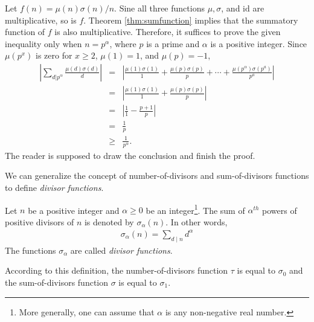 \documentclass[12pt]{subfile}
\begin{document}
	\begin{solution}
		Let $f(n)=\mu(n)\sigma(n)/n$. Sine all three functions $\mu, \sigma$, and $\text{id}$ are multiplicative, so is $f$. Theorem \ref{thm:sumfunction} implies that the summatory function of $f$ is also multiplicative. Therefore, it suffices to prove the given inequality only when $n=p^\alpha$, where $p$ is a prime and $\alpha$ is a positive integer. Since $\mu(p^x)$ is zero for $x \geq 2$, $\mu(1)=1$, and $\mu(p)=-1$,
			\begin{eqnarray*}
				\left|\sum_{d|p^\alpha}\frac{\mu(d)\sigma(d)}{d}\right|
						&=& \left|\frac{\mu(1)\sigma(1)}{1} + \frac{\mu(p)\sigma(p)}{p} + \cdots + \frac{\mu(p^\alpha)\sigma(p^a)}{p^a}\right| \\
						&=& \left|\frac{\mu(1)\sigma(1)}{1} + \frac{\mu(p)\sigma(p)}{p}\right|\\
						&=& \left|\frac{1}{1} - \frac{p+1}{p}\right|\\
						&=& \frac{1}{p}\\
						&\geq& \frac{1}{p^\alpha}.
			\end{eqnarray*}
		The reader is supposed to draw the conclusion and finish the proof.
	\end{solution}



We can generalize the concept of number-of-divisors and sum-of-divisors functions to define \textit{divisor functions}.

	\begin{definition}
		Let $n$ be a positive integer and $\alpha \geq 0$ be an integer\footnote{More generally, one can assume that $\alpha$ is any non-negative real number.}. The sum of $\alpha^{th}$ powers of positive divisors of $n$ is denoted by $\sigma_\alpha(n)$. In other words,
			\begin{align*}
				\sigma_\alpha(n) = \sum_{d\mid n} d^\alpha
			\end{align*}
		The functions $\sigma_\alpha$ are called \textit{divisor functions}.
	\end{definition}

According to this definition, the number-of-divisors function $\tau$ is equal to $\sigma_0$ and the sum-of-divisors function $\sigma$ is equal to $\sigma_1$.
\end{document}
